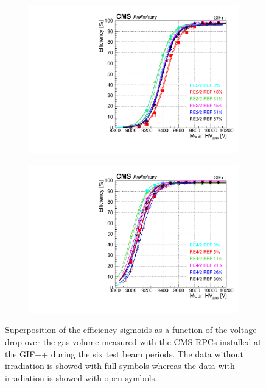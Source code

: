 \begin{figure}[H]
\begin{subfigure}{0.5\linewidth}
        	\caption{\label{fig:GIFpp_eff_vs_HVgas:B}}
    	\end{subfigure}
    	\begin{subfigure}{0.5\linewidth}
			\centering
    		\includegraphics[width = \linewidth]{fig/chapt5/efficiency_vs_HVgas_RE2_2-REF.pdf}
        	\caption{\label{fig:GIFpp_eff_vs_HVgas:C}}
    	\end{subfigure}
    	\begin{subfigure}{0.5\linewidth}
			\centering
    		\includegraphics[width = \linewidth]{fig/chapt5/efficiency_vs_HVgas_RE4_2-REF.pdf}
        	\caption{\label{fig:GIFpp_eff_vs_HVgas:D}}
    	\end{subfigure}
		\caption{\label{fig:GIFpp_eff_vs_HVgas} Superposition of the efficiency sigmoids as a function of the voltage drop over the gas volume measured with the CMS RPCs installed at the GIF++ during the six test beam periods. The data without irradiation is showed with full symbols whereas the data with irradiation is showed with open symbols.}
	\end{figure}
	
